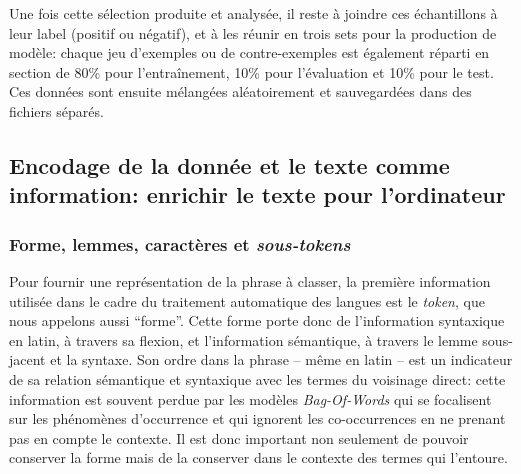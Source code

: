 Une fois cette sélection produite et analysée, il reste à joindre ces échantillons à leur label (positif ou négatif), et à les réunir en trois sets pour la production de modèle: chaque jeu d'exemples ou de contre-exemples est également réparti en section de 80\% pour l'entraînement, 10\% pour l'évaluation et 10\% pour le test. Ces données sont ensuite mélangées aléatoirement et sauvegardées dans des fichiers séparés. %

\subsection{Encodage de la donnée et le texte comme information: enrichir le texte pour l’ordinateur}


\subsubsection{Forme, lemmes, caractères et \textit{sous-tokens}}


Pour fournir une représentation de la phrase à classer, la première information utilisée dans le cadre du traitement automatique des langues est le \textit{token}, que nous appelons aussi \enquote{forme}. Cette forme porte donc de l'information syntaxique en latin, à travers sa flexion, et l'information sémantique, à travers le lemme sous-jacent et la syntaxe. Son ordre dans la phrase -- même en latin -- %
est un indicateur de sa relation sémantique et syntaxique avec les termes du voisinage direct: cette information est souvent perdue par les modèles \textit{Bag-Of-Words} qui se focalisent sur les phénomènes d'occurrence et qui ignorent les co-occurrences en ne prenant pas en compte le contexte. Il est donc important non seulement de pouvoir conserver la forme mais de la conserver dans le contexte des termes qui l'entoure. 

